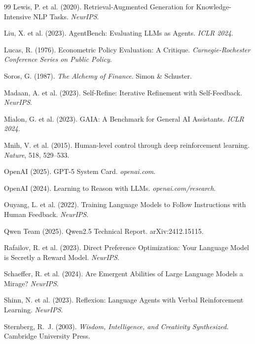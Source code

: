 \documentclass{article}
\begin{document}
\begin{thebibliography}{99}
Lewis, P. et al. (2020).
Retrieval-Augmented Generation for Knowledge-Intensive NLP Tasks.
\textit{NeurIPS}.

Liu, X. et al. (2023).
AgentBench: Evaluating LLMs as Agents.
\textit{ICLR 2024}.

Lucas, R. (1976).
Econometric Policy Evaluation: A Critique.
\textit{Carnegie-Rochester Conference Series on Public Policy}.

Soros, G. (1987).
\textit{The Alchemy of Finance}.
Simon \& Schuster.

Madaan, A. et al. (2023).
Self-Refine: Iterative Refinement with Self-Feedback.
\textit{NeurIPS}.

Mialon, G. et al. (2023).
GAIA: A Benchmark for General AI Assistants.
\textit{ICLR 2024}.

Mnih, V. et al. (2015).
Human-level control through deep reinforcement learning.
\textit{Nature}, 518, 529--533.

OpenAI (2025).
GPT-5 System Card.
\textit{openai.com}.

OpenAI (2024).
Learning to Reason with LLMs.
\textit{openai.com/research}.

Ouyang, L. et al. (2022).
Training Language Models to Follow Instructions with Human Feedback.
\textit{NeurIPS}.

Qwen Team (2025).
Qwen2.5 Technical Report.
arXiv:2412.15115.

Rafailov, R. et al. (2023).
Direct Preference Optimization: Your Language Model is Secretly
a Reward Model.
\textit{NeurIPS}.

Schaeffer, R. et al. (2024).
Are Emergent Abilities of Large Language Models a Mirage?
\textit{NeurIPS}.

Shinn, N. et al. (2023).
Reflexion: Language Agents with Verbal Reinforcement Learning.
\textit{NeurIPS}.

Sternberg, R.~J. (2003).
\textit{Wisdom, Intelligence, and Creativity Synthesized}.
Cambridge University Press.


\end{thebibliography}
\end{document}
